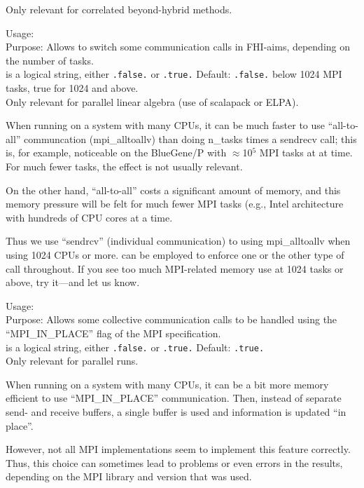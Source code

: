 Only relevant for correlated beyond-hybrid methods.


{
  \noindent
  Usage:   \\[1.0ex]
  Purpose: Allows to switch some communication calls in FHI-aims, 
    depending on the number of tasks. \\[1.0ex]
   is a logical string, either \texttt{.false.} or
    \texttt{.true.} Default: \texttt{.false.} below 1024 MPI tasks, true for 1024 and above.\\  
}
Only relevant for parallel linear algebra (use of scalapack or ELPA).

When running on a system with many CPUs, it can be much faster to use
``all-to-all'' communcation (mpi\_alltoallv) than doing n\_tasks times
a sendrecv call; this is, for example, noticeable on the BlueGene/P
with $\approx$10$^5$ MPI tasks at at time. For much fewer tasks, the
effect is not usually relevant.

On the other hand, ``all-to-all'' costs a significant amount of
memory, and this memory pressure will be felt for much fewer MPI tasks 
(e.g., Intel architecture with hundreds of CPU cores at a time. 

Thus we use ``sendrcv'' (individual communication) to using
mpi\_alltoallv when using 1024 CPUs or more. 
can be employed to enforce one or the other type of call
throughout. If you see too much MPI-related memory use at 1024 tasks
or above, try it---and let us know.

{
  \noindent
  Usage:   \\[1.0ex]
  Purpose: Allows some collective communication calls to be handled
  using the ``MPI\_IN\_PLACE'' flag of the MPI specification. \\[1.0ex]
   is a logical string, either \texttt{.false.} or
    \texttt{.true.} Default: \texttt{.true.} \\  
}
Only relevant for parallel runs.

When running on a system with many CPUs, it can be a bit more memory
efficient to use ``MPI\_IN\_PLACE'' communication. Then, instead of 
separate send- and receive buffers, a single buffer is used and information 
is updated ``in place''.

However, not all MPI implementations seem to implement this feature
correctly. Thus, this choice can sometimes lead to problems or even
errors in the results, depending on the MPI library and version that
was used.

